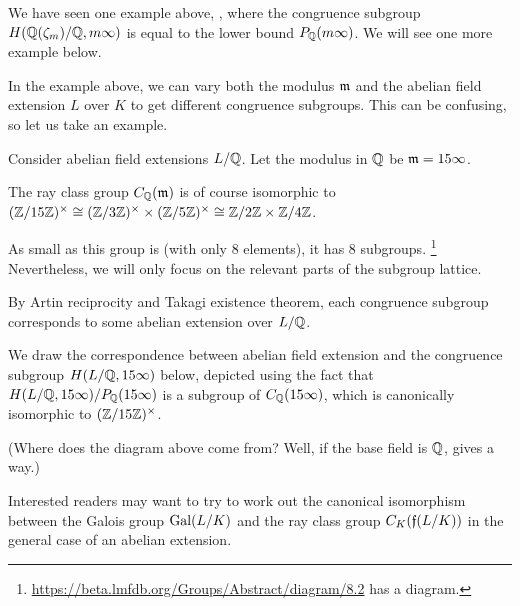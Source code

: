 We have seen one example above, , where the congruence subgroup
$H(\mathbb Q(\zeta_m)/\mathbb Q, m \infty)$ is equal to the lower bound $P_\mathbb Q(m \infty)$.
We will see one more example below.

\begin{example}
	In the example above, we can vary both the modulus $\mathfrak m$ and the abelian field extension $L$
	over $K$ to get different congruence subgroups.
	This can be confusing, so let us take an example.

	Consider abelian field extensions $L/\mathbb Q$. Let the modulus in $\mathbb Q$ be $\mathfrak m = 15 \infty$.

	The ray class group $C_\mathbb Q(\mathfrak m)$ is of course isomorphic to $(\mathbb Z/15\mathbb Z)^\times \cong (\mathbb Z/3\mathbb Z)^\times \times (\mathbb Z/5\mathbb Z)^\times
	\cong \mathbb Z/2\mathbb Z \times \mathbb Z/4\mathbb Z$.

	As small as this group is (with only 8 elements), it has 8 subgroups.%
	\footnote{\url{https://beta.lmfdb.org/Groups/Abstract/diagram/8.2} has a diagram.}
	Nevertheless, we will only focus on the relevant parts of the subgroup lattice.

	By Artin reciprocity and Takagi existence theorem, each congruence subgroup corresponds to
	some abelian extension over $L/\mathbb Q$.

	We draw the correspondence between abelian field extension and the congruence subgroup
	$H(L/\mathbb Q, 15 \infty)$ below, depicted using the fact that
	$H(L/\mathbb Q, 15 \infty)/P_\mathbb Q(15 \infty)$ is a subgroup of $C_\mathbb Q(15 \infty)$,
	which is canonically isomorphic to $(\mathbb Z/15\mathbb Z)^\times$.
	\begin{center}
	\end{center}
	(Where does the diagram above come from? Well, if the base field is $\mathbb Q$,
	 gives a way.)

	Interested readers may want to try to work out the canonical isomorphism between the Galois
	group $\operatorname{Gal}(L/K)$ and the ray class group $C_K(\mathfrak f(L/K))$
	in the general case of an abelian extension.


\end{example}
